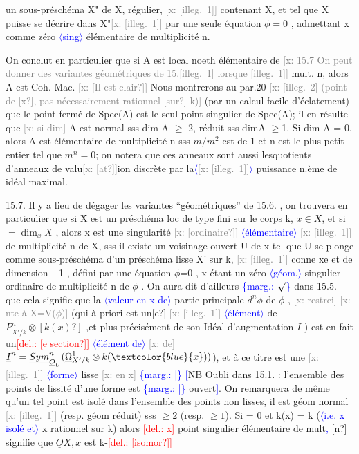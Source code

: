 \documentclass[11pt]{article}
\newcommand{\hand}[1]{\textcolor{blue}{#1}}
\let\over\relax
\newcommand{\over}[2]{\textcolor{gray}{#1}\textcolor{blue}{\ensuremath{^{\!\nearrow}}#2}}
\newcommand{\inserted}[2][]{\textcolor{blue}{$\langle$#2$\rangle$}}
\newcommand{\margin}[1]{\textcolor{blue}{\{\textsf{marg.:} #1\}}}
\newcommand{\deleted}[1]{\textcolor{red}{[\textsf{del.:} #1]}}
\newcommand{\xout}[1]{\textcolor{gray}{[\textsf{x:} #1]}}
\newcommand{\unsure}[1]{[#1?]}
\newcommand{\illegible}[1]{[\textsf{illeg.\ #1}]}
\begin{document}
un sous-préschéma X" de X, régulier, \xout{\illegible{1}} contenant X, et tel que X
puisse se décrire dans X"\xout{\illegible{1}} par une seule équation $\phi = 0$ , admettant x comme
zéro \inserted{sing} élémentaire de multiplicité n.

On conclut en particulier que si A est local noeth élémentaire de
\xout{15.7 On peut donner des variantes géométriques de 15.\illegible{1} lorsque \illegible{1}}
mult. n, alors A est Coh. Mac. \xout{\unsure{Il est clair}} Nous montrerons au par.20
\xout{\illegible{2} (point de \unsure{x}, pas nécessairement rationnel \unsure{sur} k)}
(par un calcul facile d'éclatement) que le point fermé de Spec(A) est
le seul point singulier de Spec(A); il en résulte que \xout{si dim} A est normal
sss dim A $\geqslant$ 2, réduit sss dimA $\geqslant$1. Si dim A = 0, alors  A est élémentaire
de multiplicité n sss  $m/m^2$ est de \over{dim}{\unsure{rang}}1 et  n est le plus petit entier
tel que $\underline{m}^n = 0$; on notera que ces anneaux sont aussi lesquotients d'anneaux
de valu\xout{\unsure{at}}ion discrète par la\inserted[typed]{\xout{\illegible{1}}} puissance n.ème de \over{l'}{leur} idéal maximal.

15.7.   Il y a lieu de dégager les variantes ``géométriques'' de 15.6. ,
on trouvera en particulier que si X est un préschéma loc de type fini sur
le corps k, $x \in X$, et si \over{n}{d} $= \dim_x X$ , alors  x est une singularité \xout{\unsure{ordinaire}}
\inserted[typed]{élémentaire}
\xout{\illegible{1}} de multiplicité  n de X, sss il existe un voisinage ouvert U de x
tel que U se plonge comme sous-préschéma d'un préschéma lisse X' sur k,
\xout{\illegible{1}} conne xe et de dimension \over{n}{d}+1 , défini par une équation $\phi$=0 , x étant
un zéro \inserted{géom.} singulier ordinaire de multiplicité n de $\phi$ . On aura dit d'ailleurs
\margin{$\surd$} dans 15.5. que cela signifie  que  la \inserted{valeur en x de} partie principale $d^n\phi$ de $\phi$ , \xout{restrei}
\xout{nte à X=V($\phi$)} (qui à priori est un\unsure{e} \xout{\illegible{1}} \inserted{élément} de $\underline{P}^n_{X'/k}\otimes \unsure{\underline{k}(x)}$ ,et plus
précisément de son Idéal d'augmentation $\underline{I}$ )  est en fait un\deleted{\unsure{e section}} \inserted{élément de}
\xout{de} $\underline{I}^n = \underline{Sym}^n_{\underline{O}_U}(\underline{\Omega}^1_{X'/k}\otimes k(\hand{x}))$), et  à ce titre est une \xout{\illegible{1}} \inserted{forme} lisse \xout{en x}
\margin{|} \hand{[}NB Oubli dans 15.1. : l'ensemble des points de lissité d'une forme est
\margin{|} ouvert\hand{]}. On remarquera de même qu'un tel point est isolé dans l'ensemble
des points non lisses, il est géom normal \xout{\illegible{1}} (resp. géom réduit) sss
\over{n}{d} $\geqslant 2$  (resp. \over{n}{d} $\geqslant 1$). Si \over{n}{d} = 0 et k(x) = k (\inserted{i.e. x  isolé et} x rationnel sur k) alors \deleted{x}
point singulier élémentaire  de mult\hand{,} \unsure{n} signifie que $\underline{O}X,x$  est  k-\deleted{\unsure{isomor}}
\end{document}
